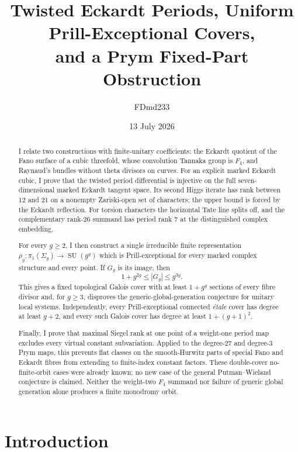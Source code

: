 \documentclass[11pt,reqno]{amsart}
\title[Twisted Eckardt periods and Prym obstructions]
{Twisted Eckardt Periods, Uniform Prill-Exceptional Covers,\\
and a Prym Fixed-Part Obstruction}
\author{FDmd233}
\date{13 July 2026}
\numberwithin{equation}{section}
\theoremstyle{definition}
\theoremstyle{remark}
\newcommand{\SU}{\operatorname{SU}}
\begin{document}
\begin{abstract}
I relate two constructions with finite-unitary coefficients: the Eckardt quotient of the Fano surface of a cubic threefold, whose convolution Tannaka group is $F_4$, and Raynaud's bundles without theta divisors on curves.  For an explicit marked Eckardt cubic, I prove that the twisted period differential is injective on the full seven-dimensional marked Eckardt tangent space.  Its second Higgs iterate has rank between $12$ and $21$ on a nonempty Zariski-open set of characters; the upper bound is forced by the Eckardt reflection.  For torsion characters the horizontal Tate line splits off, and the complementary rank-$26$ summand has period rank $7$ at the distinguished complex embedding.

For every $g\ge2$, I then construct a single irreducible finite representation
$\rho_g:\pi_1(\Sigma_g)\to \SU(g^g)$ which is Prill-exceptional for every marked complex structure and every point.  If $G_g$ is its image, then
\[
1+g^{2g}\le |G_g|\le g^{3g}.
\]
This gives a fixed topological Galois cover with at least $1+g^g$ sections of every fibre divisor and, for $g\ge3$, disproves the generic-global-generation conjecture for unitary local systems.  Independently, every Prill-exceptional connected \emph{\'etale} cover has degree at least $g+2$, and every such Galois cover has degree at least $1+(g+1)^2$.

Finally, I prove that maximal Siegel rank at one point of a weight-one period map excludes every virtual constant subvariation.  Applied to the degree-$27$ and degree-$3$ Prym maps, this prevents flat classes on the smooth-Hurwitz parts of special Fano and Eckardt fibres from extending to finite-index constant factors.  These double-cover no-finite-orbit cases were already known; no new case of the general Putman--Wieland conjecture is claimed.  Neither the weight-two $F_4$ summand nor failure of generic global generation alone produces a finite monodromy orbit.
\end{abstract}

\maketitle

\section{Introduction}
\end{document}
